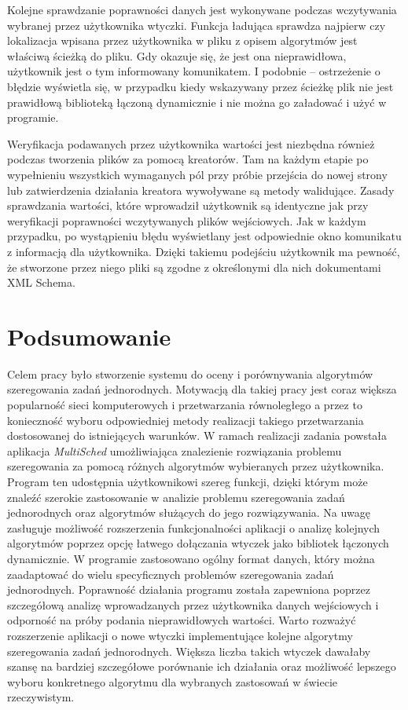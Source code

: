 Kolejne sprawdzanie poprawności danych jest wykonywane podczas wczytywania wybranej przez użytkownika wtyczki. Funkcja ładująca sprawdza najpierw 
czy lokalizacja wpisana przez użytkownika w pliku z opisem algorytmów jest właściwą ścieżką do pliku. Gdy okazuje się, że jest ona nieprawidłowa, 
użytkownik jest o tym informowany komunikatem. I podobnie -- ostrzeżenie o błędzie wyświetla się, w przypadku kiedy wskazywany przez ścieżkę plik 
nie jest prawidłową biblioteką łączoną dynamicznie i nie można go załadować i użyć w programie.

Weryfikacja podawanych przez użytkownika wartości jest niezbędna również podczas tworzenia plików za pomocą kreatorów. Tam na każdym etapie 
po wypełnieniu wszystkich wymaganych pól przy próbie przejścia do nowej strony lub zatwierdzenia działania kreatora wywoływane są metody walidujące.
Zasady sprawdzania wartości, które wprowadził  użytkownik są identyczne jak przy weryfikacji poprawności wczytywanych plików wejściowych.
Jak w każdym przypadku, po wystąpieniu błędu wyświetlany jest odpowiednie okno komunikatu z informacją dla użytkownika. Dzięki takiemu podejściu 
użytkownik ma pewność, że stworzone przez niego pliki są zgodne z określonymi dla nich dokumentami XML Schema.

\chapter{Podsumowanie}

Celem pracy było stworzenie systemu do oceny i porównywania algorytmów szeregowania zadań jednorodnych. Motywacją dla takiej pracy jest 
coraz większa popularność sieci komputerowych i przetwarzania równoległego a przez to konieczność wyboru odpowiedniej metody realizacji 
takiego przetwarzania dostosowanej do istniejących warunków. W ramach realizacji zadania powstała aplikacja \emph{MultiSched} umożliwiająca 
znalezienie rozwiązania problemu szeregowania za pomocą różnych algorytmów wybieranych przez użytkownika. Program ten udostępnia użytkownikowi 
szereg funkcji, dzięki którym może znaleźć szerokie zastosowanie w analizie problemu szeregowania zadań jednorodnych oraz algorytmów służących 
do jego rozwiązywania. Na uwagę zasługuje możliwość rozszerzenia funkcjonalności aplikacji o analizę kolejnych algorytmów poprzez opcję 
łatwego dołączania wtyczek jako bibliotek łączonych dynamicznie. W programie zastosowano ogólny format danych, który można zaadaptować do wielu 
specyficznych problemów szeregowania zadań jednorodnych. Poprawność działania programu została zapewniona poprzez szczegółową analizę 
wprowadzanych przez użytkownika danych wejściowych i odporność na próby podania nieprawidłowych wartości.
Warto rozważyć rozszerzenie aplikacji o nowe wtyczki implementujące kolejne algorytmy szeregowania zadań jednorodnych. Większa liczba takich 
wtyczek dawałaby szansę na bardziej szczegółowe porównanie ich działania oraz możliwość lepszego wyboru konkretnego algorytmu dla wybranych 
zastosowań w świecie rzeczywistym.

